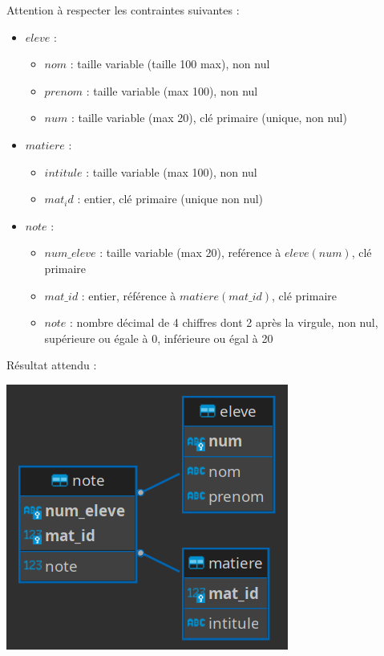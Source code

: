 \documentclass[a4paper,17pt]{extarticle}
\providecommand{\tightlist}{%
      \setlength{\itemsep}{0pt}\setlength{\parskip}{0pt}}
\begin{document}
    Attention à respecter les contraintes suivantes :

\begin{itemize}
\tightlist
\item
  \(eleve\) :

  \begin{itemize}
  \tightlist
  \item
    \(nom\) : taille variable (taille 100 max), non nul
  \item
    \(prenom\) : taille variable (max 100), non nul
  \item
    \(num\) : taille variable (max 20), clé primaire (unique, non nul)
  \end{itemize}
\item
  \(matiere\) :

  \begin{itemize}
  \tightlist
  \item
    \(intitule\) : taille variable (max 100), non nul
  \item
    \(mat_id\) : entier, clé primaire (unique non nul)
  \end{itemize}
\item
  \(note\) :

  \begin{itemize}
  \tightlist
  \item
    \(num\_eleve\) : taille variable (max 20), reférence à
    \(eleve(num)\), clé primaire
  \item
    \(mat\_id\) : entier, référence à \(matiere(mat\_id)\), clé primaire
  \item
    \(note\) : nombre décimal de 4 chiffres dont 2 après la virgule, non
    nul, supérieure ou égale à 0, inférieure ou égal à 20
  \end{itemize}
\end{itemize}

    Résultat attendu :

    \includegraphics{./img-ex_note_db.png}
\end{document}
